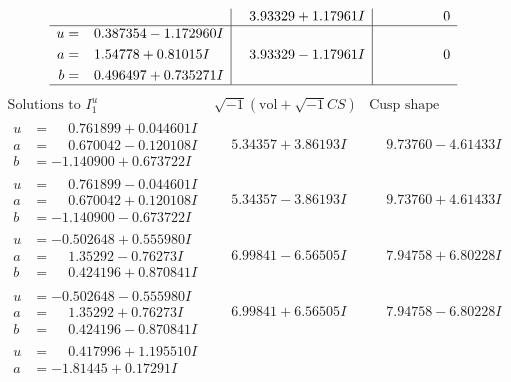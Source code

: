 \documentclass[1p]{elsarticle_modified}
\theoremstyle{definition}
\newcommand{\I}{\sqrt{-1}}
\begin{document}
$$\begin{array}{c|c|c}
 & \phantom{-}3.93329 + 1.17961 I & \phantom{-0.000000 } 0 \\ \hline\begin{aligned}
u &= \phantom{-}0.387354 - 1.172960 I \\
a &= \phantom{-}1.54778 + 0.81015 I \\
b &= \phantom{-}0.496497 + 0.735271 I\end{aligned}
 & \phantom{-}3.93329 - 1.17961 I & \phantom{-0.000000 } 0\\
 \hline 
 \end{array}$$\newpage$$\begin{array}{c|c|c}  
\text{Solutions to }I^u_{1}& \I (\text{vol} + \sqrt{-1}CS) & \text{Cusp shape}\\
 \hline 
\begin{aligned}
u &= \phantom{-}0.761899 + 0.044601 I \\
a &= \phantom{-}0.670042 - 0.120108 I \\
b &= -1.140900 + 0.673722 I\end{aligned}
 & \phantom{-}5.34357 + 3.86193 I & \phantom{-}9.73760 - 4.61433 I \\ \hline\begin{aligned}
u &= \phantom{-}0.761899 - 0.044601 I \\
a &= \phantom{-}0.670042 + 0.120108 I \\
b &= -1.140900 - 0.673722 I\end{aligned}
 & \phantom{-}5.34357 - 3.86193 I & \phantom{-}9.73760 + 4.61433 I \\ \hline\begin{aligned}
u &= -0.502648 + 0.555980 I \\
a &= \phantom{-}1.35292 - 0.76273 I \\
b &= \phantom{-}0.424196 + 0.870841 I\end{aligned}
 & \phantom{-}6.99841 - 6.56505 I & \phantom{-}7.94758 + 6.80228 I \\ \hline\begin{aligned}
u &= -0.502648 - 0.555980 I \\
a &= \phantom{-}1.35292 + 0.76273 I \\
b &= \phantom{-}0.424196 - 0.870841 I\end{aligned}
 & \phantom{-}6.99841 + 6.56505 I & \phantom{-}7.94758 - 6.80228 I \\ \hline\begin{aligned}
u &= \phantom{-}0.417996 + 1.195510 I \\
a &= -1.81445 + 0.17291 I \\

\end{aligned}
\end{array}$$
\end{document}
